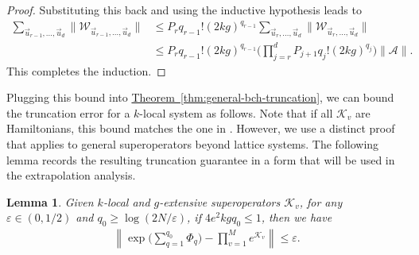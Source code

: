 \documentclass[aps,pra,reprint,groupedaddress,floatfix]{revtex4-2}
\newtheorem{lemma}{Lemma}
\newcommand{\thm}[1]{\hyperref[thm:#1]{Theorem~\ref*{thm:#1}}}
\newcommand{\eps}{\varepsilon}
\newcommand{\mc}{\mathcal}
\begin{document}
\begin{proof}
    Substituting this back and using the inductive hypothesis leads to
    \begin{align*}
        \sum_{\vec{u}_{r-1}, \ldots, \vec{u}_d} \Big\|\mathcal{W}_{\vec{u}_{r-1}, \ldots, \vec{u}_d}\Big\| 
        &\le P_r q_{r-1}! (2kg)^{q_{r-1}} \sum_{\vec{u}_{r}, \ldots, \vec{u}_d} \Big\|\mathcal{W}_{\vec{u}_{r}, \ldots, \vec{u}_d}\Big\| \\
        &\le P_r q_{r-1}! (2kg)^{q_{r-1}}  \bigg(\prod_{j=r}^{d}P_{j+1} q_j!(2kg)^{q_j}\bigg)\|\mc A\|.
    \end{align*}
    This completes the induction.
\end{proof}

Plugging this bound into \thm{general-bch-truncation}, we can bound the truncation error for a $k$-local system as follows. Note that if all $\mathcal{K}_v$ are Hamiltonians, this bound matches the one in \citet[Theorem 3]{mizuta2025commutator}. However, we use a distinct proof that applies to general superoperators beyond lattice systems. The following lemma records the resulting truncation guarantee in a form that will be used in the extrapolation analysis.
\begin{lemma}
\label{lem:bch-approx}
    Given $k$-local and $g$-extensive superoperators $\mc K_v$, for any $\eps\in (0,1/2)$ and  $q_0 \ge \log(2N/\eps)$, if $4e^2kgq_0\le 1$, then we have \begin{align*}
        \left\|\exp\Big(\sum_{q=1}^{q_0} \Phi_q\Big) - \prod_{v = 1}^Me^{\mc K_v} \right\|\le \eps.
    \end{align*}
\end{lemma}
\end{document}
